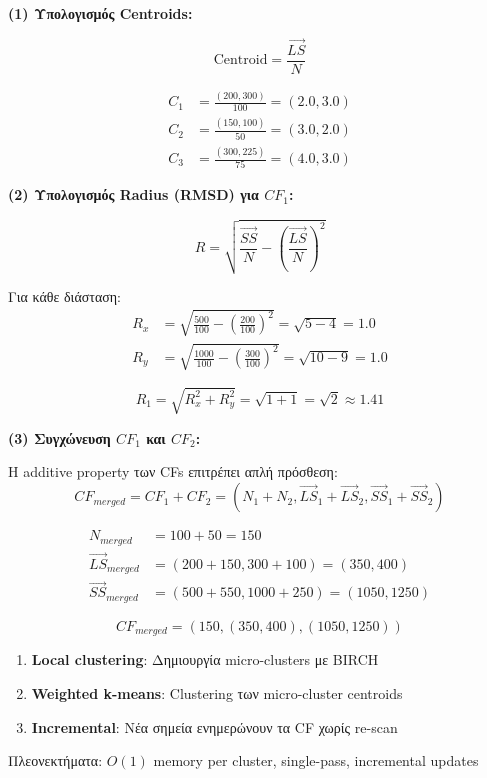\textbf{(1) Υπολογισμός Centroids:}

$$\text{Centroid} = \frac{\vec{LS}}{N}$$

\begin{align*}
C_1 &= \frac{(200, 300)}{100} = (2.0, 3.0) \\
C_2 &= \frac{(150, 100)}{50} = (3.0, 2.0) \\
C_3 &= \frac{(300, 225)}{75} = (4.0, 3.0)
\end{align*}

\textbf{(2) Υπολογισμός Radius (RMSD) για $CF_1$:}

$$R = \sqrt{\frac{\vec{SS}}{N} - \left(\frac{\vec{LS}}{N}\right)^2}$$

Για κάθε διάσταση:
\begin{align*}
R_x &= \sqrt{\frac{500}{100} - \left(\frac{200}{100}\right)^2} = \sqrt{5 - 4} = 1.0 \\
R_y &= \sqrt{\frac{1000}{100} - \left(\frac{300}{100}\right)^2} = \sqrt{10 - 9} = 1.0
\end{align*}

$$R_1 = \sqrt{R_x^2 + R_y^2} = \sqrt{1 + 1} = \sqrt{2} \approx 1.41$$

\textbf{(3) Συγχώνευση $CF_1$ και $CF_2$:}

Η additive property των CFs επιτρέπει απλή πρόσθεση:
$$CF_{merged} = CF_1 + CF_2 = (N_1 + N_2, \vec{LS}_1 + \vec{LS}_2, \vec{SS}_1 + \vec{SS}_2)$$

\begin{align*}
N_{merged} &= 100 + 50 = 150 \\
\vec{LS}_{merged} &= (200 + 150, 300 + 100) = (350, 400) \\
\vec{SS}_{merged} &= (500 + 550, 1000 + 250) = (1050, 1250)
\end{align*}

$$CF_{merged} = (150, (350, 400), (1050, 1250))$$

\begin{infobox}
\begin{enumerate}
    \item \textbf{Local clustering}: Δημιουργία micro-clusters με BIRCH
    \item \textbf{Weighted k-means}: Clustering των micro-cluster centroids
    \item \textbf{Incremental}: Νέα σημεία ενημερώνουν τα CF χωρίς re-scan
\end{enumerate}
Πλεονεκτήματα: $O(1)$ memory per cluster, single-pass, incremental updates
\end{infobox}

